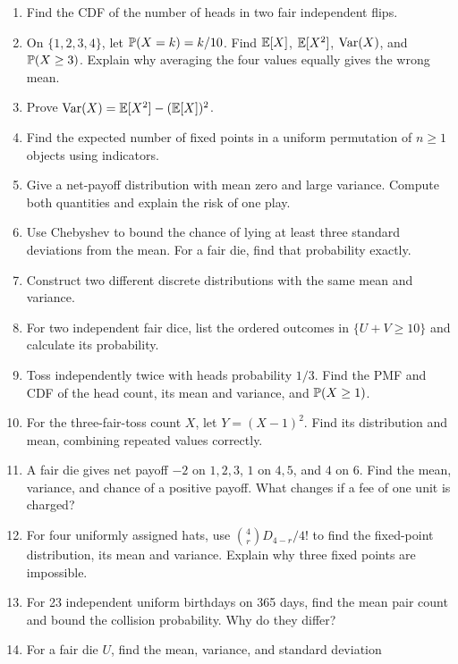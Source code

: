 \begin{exercisebox}
\begin{enumerate}
 \item Find the CDF of the number of heads in two fair independent flips.
 \item On $\{1,2,3,4\}$, let $\P(X=k)=k/10$. Find $\E[X]$,
 $\E[X^2]$, $\Var(X)$, and $\P(X\ge3)$. Explain why averaging the four
 values equally gives the wrong mean. 
 \item Prove $\Var(X)=\E[X^2]-(\E[X])^2$. 
 \item Find the expected number of fixed points in a uniform permutation
 of $n\ge1$ objects using indicators. 
 \item Give a net-payoff distribution with mean zero and large variance.
 Compute both quantities and explain the risk of one play. 
 \item Use Chebyshev to bound the chance of lying at least three standard
 deviations from the mean. For a fair die, find that probability exactly.
 \item Construct two different discrete distributions with the same
 mean and variance. 
 \item For two independent fair dice, list the ordered outcomes in
 $\{U+V\ge10\}$ and calculate its probability. 
 \item Toss independently twice with heads probability $1/3$. Find
 the PMF and CDF of the head count, its mean and variance, and $\P(X\ge1)$.
 \item For the three-fair-toss count $X$, let $Y=(X-1)^2$.
 Find its distribution and mean, combining repeated values correctly.
 \item A fair die gives net payoff $-2$ on $1,2,3$, $1$ on $4,5$,
 and $4$ on $6$. Find the mean, variance, and chance of a positive
 payoff. What changes if a fee of one unit is charged? 
 \item For four uniformly assigned hats, use $\binom4rD_{4-r}/4!$
 to find the fixed-point distribution, its mean and variance.
 Explain why three fixed points are impossible. 
 \item For 23 independent uniform birthdays on 365 days, find the mean
 pair count and bound the collision probability. Why do they differ?
 \item For a fair die $U$, find the mean, variance, and standard deviation

\end{enumerate}
\end{exercisebox}
